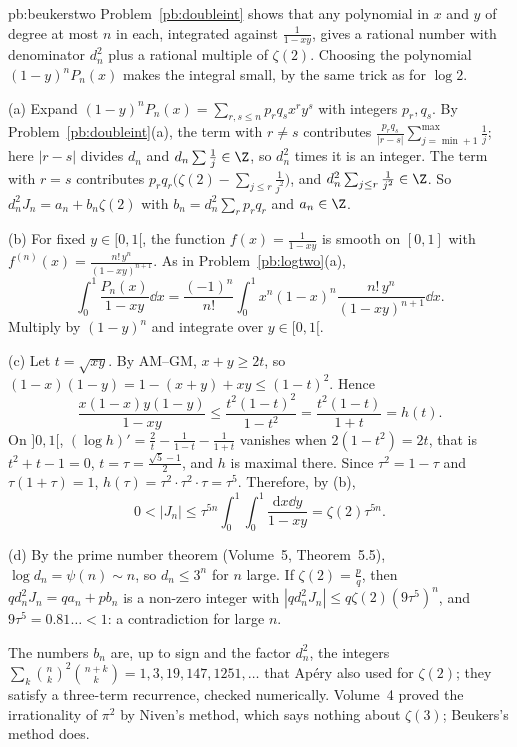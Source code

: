 \begin{solution}{pb:beukerstwo}
\idea Problem~\ref{pb:doubleint} shows that any polynomial in $x$ and $y$ of degree at most $n$ in each, integrated against $\frac1{1-xy}$,
gives a rational number with denominator $d_n^2$ plus a rational multiple of $\zeta(2)$. Choosing the polynomial $(1-y)^nP_n(x)$ makes
the integral small, by the same trick as for $\log2$.

\writeup (a) Expand $(1-y)^nP_n(x)=\sum_{r,s\le n}p_rq_sx^ry^s$ with integers $p_r,q_s$. By Problem~\ref{pb:doubleint}(a), the term with $r\ne s$
contributes $\frac{p_rq_s}{|r-s|}\sum_{j=\min+1}^{\max}\frac1j$; here $|r-s|$ divides $d_n$ and $d_n\sum\frac1j\in\Z$, so $d_n^2$ times it is an
integer. The term with $r=s$ contributes $p_rq_r\bigl(\zeta(2)-\sum_{j\le r}\frac1{j^2}\bigr)$, and $d_n^2\sum_{j\le r}\frac1{j^2}\in\Z$. So
$d_n^2J_n=a_n+b_n\zeta(2)$ with $b_n=d_n^2\sum_rp_rq_r$ and $a_n\in\Z$.

(b) For fixed $y\in[0,1[$, the function $f(x)=\frac1{1-xy}$ is smooth on $[0,1]$ with $f^{(n)}(x)=\frac{n!\,y^n}{(1-xy)^{n+1}}$. As in
Problem~\ref{pb:logtwo}(a),
\[
\int_0^1\frac{P_n(x)}{1-xy}\dd x=\frac{(-1)^n}{n!}\int_0^1x^n(1-x)^n\frac{n!\,y^n}{(1-xy)^{n+1}}\dd x.
\]
Multiply by $(1-y)^n$ and integrate over $y\in[0,1[$.

(c) Let $t=\sqrt{xy}$. By AM--GM, $x+y\ge2t$, so $(1-x)(1-y)=1-(x+y)+xy\le(1-t)^2$. Hence
\[
\frac{x(1-x)y(1-y)}{1-xy}\le\frac{t^2(1-t)^2}{1-t^2}=\frac{t^2(1-t)}{1+t}=h(t).
\]
On $]0,1[$, $(\log h)'=\frac2t-\frac1{1-t}-\frac1{1+t}$ vanishes when $2(1-t^2)=2t$, that is $t^2+t-1=0$, $t=\tau=\frac{\sqrt5-1}2$, and $h$
is maximal there. Since $\tau^2=1-\tau$ and $\tau(1+\tau)=1$, $h(\tau)=\tau^2\cdot\tau^2\cdot\tau=\tau^5$. Therefore, by (b),
\[
0<|J_n|\le\tau^{5n}\int_0^1\!\!\int_0^1\frac{\mathrm dx\dd y}{1-xy}=\zeta(2)\tau^{5n}.
\]

(d) By the prime number theorem (Volume~5, Theorem~5.5), $\log d_n=\psi(n)\sim n$, so $d_n\le3^n$ for $n$ large. If $\zeta(2)=\frac pq$, then
$q d_n^2J_n=qa_n+pb_n$ is a non-zero integer with $|qd_n^2J_n|\le q\zeta(2)(9\tau^5)^n$, and $9\tau^5=0.81\ldots<1$: a contradiction for large $n$.

\leads The numbers $b_n$ are, up to sign and the factor $d_n^2$, the integers $\sum_k\binom nk^2\binom{n+k}k=1,3,19,147,1251,\dots$ that Apéry also
used for $\zeta(2)$; they satisfy a three-term recurrence, checked numerically. Volume~4 proved the irrationality of
$\pi^2$ by Niven's method, which says nothing about $\zeta(3)$; Beukers's method does.
\end{solution}

